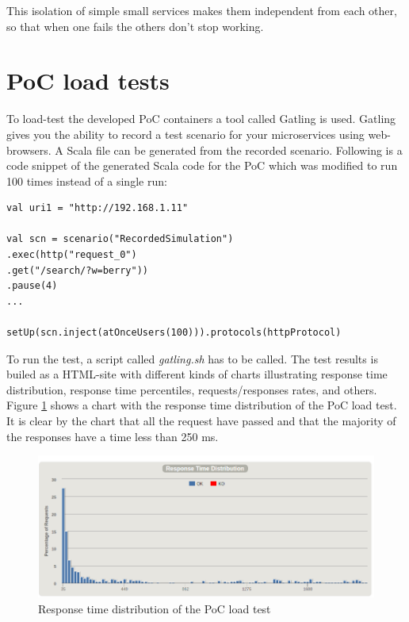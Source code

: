 This isolation of simple small services makes them independent from each other, so that when one fails the others don’t stop working.   

\section{PoC load tests}
To load-test the developed PoC containers a tool called Gatling is used. Gatling gives you the ability to record a test scenario for your microservices using web-browsers. A Scala file can be generated from the recorded scenario. Following is a code snippet of the generated Scala code for the PoC which was modified to run 100 times instead of a single run: \begin{lstlisting}[frame=single, ]
val uri1 = "http://192.168.1.11"

val scn = scenario("RecordedSimulation")
.exec(http("request_0")
.get("/search/?w=berry"))
.pause(4)
...

setUp(scn.inject(atOnceUsers(100))).protocols(httpProtocol)
\end{lstlisting}

To run the test, a script called \textit{gatling.sh} has to be called. The test results is builed as a HTML-site with different kinds of charts illustrating response time distribution, response time percentiles, requests/responses rates, and others. Figure \ref{fig:responseTimeDistribution} shows a chart with the response time distribution of the PoC load test. It is clear by the chart that all the request have passed and that the majority of the responses have a time less than 250 ms.

\begin{figure}[bth]
	\centering 
	\includegraphics[width=1\linewidth]{gfx/responseTimeDistribution}
	\caption[responseTimeDistribution]{Response time distribution of the PoC load test} \label{fig:responseTimeDistribution}
\end{figure}